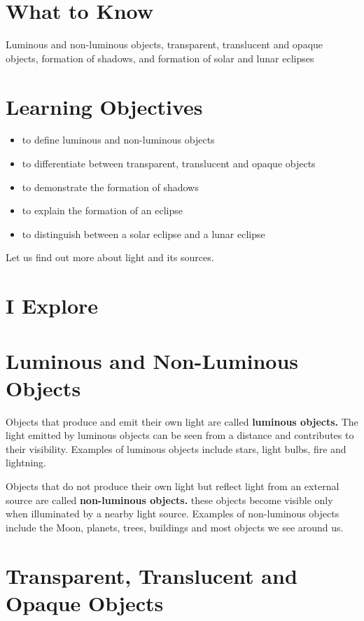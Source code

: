 \section{What to Know}
Luminous and non-luminous objects, transparent, translucent and opaque objects, formation of shadows, and formation of solar and lunar eclipses
\section{\textbf{Learning Objectives}}
\begin{itemize}
    \item to define luminous and non-luminous objects
    \item to differentiate between transparent, translucent and opaque objects
    \item to demonstrate the formation of shadows
    \item to explain the formation of an eclipse
    \item to distinguish between a solar eclipse and a lunar eclipse
\end{itemize}
\vspace{0.4in}
\par
Let us find out more about light and its sources.
\vspace{1.2in}
\section{I Explore}
\section{Luminous and Non-Luminous Objects}
Objects that produce and emit their own light are called \textbf{luminous objects.} The light emitted by luminous objects can be seen from a distance and contributes to their visibility. Examples of luminous objects include stars, light bulbs, fire and lightning.
\vspace{0.1in}
\par
Objects that do not produce their own light but reflect light from an external source are called \textbf{non-luminous objects.} these objects become visible only when illuminated by a nearby light source. Examples of non-luminous objects include the Moon, planets, trees, buildings and most objects we see around us.
\vspace{1.0in}
\section{Transparent, Translucent and Opaque Objects}
